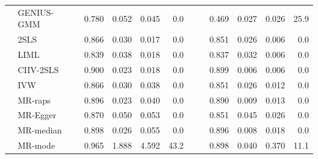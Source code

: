 \documentclass[12pt]{article}
\begin{document}
{\begin{table}[ht]
{\begin{tabular}{llcrrrrlrrrr}
           & {GENIUS-GMM}   & 0.780   & 0.052 & 0.045  & 0.0     &  &             & 0.469  & 0.027 & 0.026 & 25.9 \\
           & 2SLS         & 0.866  & 0.030  & 0.017  & 0.0     &  &             & 0.851  & 0.026 & 0.006 & 0.0    \\
           & LIML         & 0.839  & 0.038 & 0.018  & 0.0     &  &             & 0.837  & 0.032 & 0.006 & 0.0    \\
            & {CIIV-2SLS}     &0.900&	0.023	&	0.018	&0.0	&&&		0.899	&0.006	&0.006	&0.0 \\
           & IVW          & 0.866  & 0.030  & 0.038  & 0.0     &  &             & 0.851  & 0.026 & 0.012 & 0.0    \\
           & MR-raps      & 0.896  & 0.023 & 0.040   & 0.0     &  &             & 0.890   & 0.009 & 0.013 & 0.0    \\
           & MR-Egger     & 0.870   & 0.050  & 0.053  & 0.0     &  &             & 0.851  & 0.045 & 0.026 & 0.0    \\
           & MR-median    & 0.898  & 0.026 & 0.055  & 0.0     &  &             & 0.896  & 0.008 & 0.018 & 0.0    \\
           & MR-mode      & 0.965  & 1.888 & 4.592  & 43.2  &  &             & 0.898  & 0.040  & 0.370  & 11.1\\\hline 
\end{tabular}}
\end{table}




}
\end{document}
